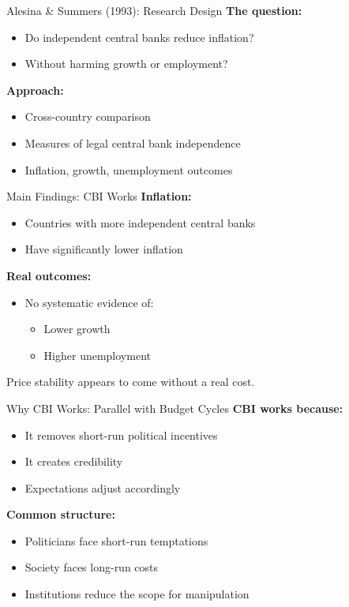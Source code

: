 \documentclass[10pt]{beamer}
\begin{document}
\begin{frame}{Alesina \& Summers (1993): Research Design}
\textbf{The question:}
\begin{itemize}
\item Do independent central banks reduce inflation?
\item Without harming growth or employment?
\end{itemize}

\vspace{0.3cm}
\textbf{Approach:}
\begin{itemize}
\item Cross-country comparison
\item Measures of legal central bank independence
\item Inflation, growth, unemployment outcomes
\end{itemize}
\end{frame}


\begin{frame}{Main Findings: CBI Works}
\textbf{Inflation:}
\begin{itemize}
\item Countries with more independent central banks
\item Have \alert{significantly lower inflation}
\end{itemize}

\vspace{0.4cm}
\textbf{Real outcomes:}
\begin{itemize}
\item No systematic evidence of:
\begin{itemize}
\item Lower growth
\item Higher unemployment
\end{itemize}
\end{itemize}

\vspace{0.3cm}
\alert{Price stability appears to come without a real cost.}
\end{frame}


\begin{frame}{Why CBI Works: Parallel with Budget Cycles}
\textbf{CBI works because:}
\begin{itemize}
\item It removes short-run political incentives
\item It creates credibility
\item Expectations adjust accordingly
\end{itemize}

\vspace{0.4cm}
\textbf{Common structure:}
\begin{itemize}
\item Politicians face short-run temptations
\item Society faces long-run costs
\item Institutions reduce the scope for manipulation
\end{itemize}
\end{frame}
\end{document}
